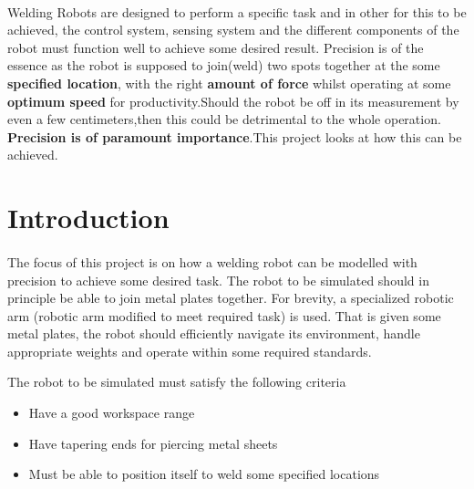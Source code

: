 \documentclass[12pt]{article}
\begin{document}
\paragraph{}
Welding Robots are designed to perform a specific 
task and in other for this to be achieved, the 
control system, sensing system and the 
different components of the robot must 
function well to 
achieve some desired result. Precision is of the essence as the robot is supposed to join(weld) two spots together  at the 
some \textbf{specified location}, with the right \textbf{amount of force} whilst operating at some \textbf{optimum speed} for productivity.Should the robot
be off in its measurement by even a few centimeters,then this could be detrimental to the whole operation. \textbf{Precision is of paramount importance}.This project looks at how this can be achieved.



\section{Introduction}
\paragraph{}
The focus of this project is on how a welding robot can be modelled with precision to achieve some desired task.
The robot to be simulated should in principle be able to join metal plates together. 
For brevity, a specialized robotic arm (robotic arm modified to meet required task) is used.
That is given some metal plates, the robot should efficiently navigate its environment,
handle appropriate weights and operate within some required standards.

The robot to be simulated must satisfy the following criteria
\begin{itemize}
   \item Have a good workspace range
   \item Have tapering ends for piercing metal sheets
   \item Must be able to position itself to weld some specified locations
\end{itemize}
\end{document}

